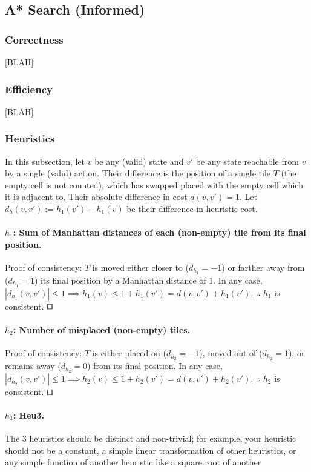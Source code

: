 \documentclass[runningheads]{llncs}
\begin{document}
\subsection{A* Search (Informed)}
\subsubsection{Correctness}
[BLAH]

\subsubsection{Efficiency}
[BLAH]

\subsubsection{Heuristics}
In this subsection, let $v$ be any (valid) state and $v'$ be any state reachable from $v$ by a single (valid) action. Their difference is the position of a single tile $T$ (the empty cell is not counted), which has swapped placed with the empty cell which it is adjacent to. Their absolute difference in cost $d(v,v') = 1$. Let $d_h(v,v') := h_1(v')-h_1(v)$ be their difference in heuristic cost.

\paragraph{$h_1$: Sum of Manhattan distances of each (non-empty) tile from its final position.}
Proof of consistency: $T$ is moved either closer to ($d_{h_1} = -1$) or farther away from ($d_{h_1} = 1$) its final position by a Manhattan distance of 1.
In any case, $|d_{h_1}(v,v')|\leq 1 \implies h_1(v) \leq 1+h_1(v') = d(v,v')+h_1(v')$, $\therefore$ $h_1$ is consistent. $\qed$

\paragraph{$h_2$: Number of misplaced (non-empty) tiles.}
Proof of consistency: $T$ is either placed on ($d_{h_2} = -1$), moved out of ($d_{h_2} = 1$), or remains away ($d_{h_2} = 0$) from its final position.
In any case, $|d_{h_2}(v,v')|\leq 1 \implies h_2(v) \leq 1+h_2(v') = d(v,v')+h_2(v')$, $\therefore$ $h_2$ is consistent. $\qed$

\paragraph{$h_3$: Heu3.}
The 3 heuristics should be distinct and non-trivial; for example, your heuristic should not be a constant, a simple linear transformation of other heuristics, or any simple function of another heuristic like a square root of another
\end{document}
